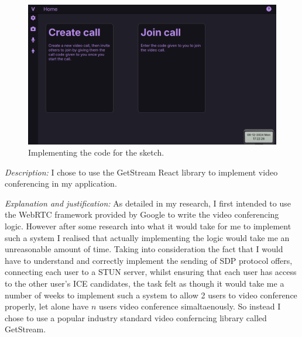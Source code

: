 \begin{figure}[H]
\centering

\includegraphics[scale=0.2]{Images/Sketch_final.png}

\caption{Implementing the code for the sketch.}
\end{figure}

\textit{Description:} I chose to use the GetStream React
library to implement video conferencing in my application. \\ 
\vspace{0.2cm}

\textit{Explanation and justification:} As detailed in my research, I first 
intended to use the WebRTC framework provided by Google to 
write the video conferencing logic. However after some research 
into what it would take for me to implement such a system I 
realised that actually implementing the logic would take me 
an unreasonable amount of time. Taking into consideration the
fact that I would have to understand and correctly implement 
the sending of SDP protocol offers, connecting each user to a
STUN server, whilst ensuring that each user has access to 
the other user's ICE candidates, the task felt as though it
would take me a number of weeks to implement such a system 
to allow 2 users to video conference properly, let alone have 
$n$ users video conference simaltaenously. So instead I chose 
to use a popular industry standard video conferncing library 
called GetStream. \\ \vspace{0.2cm}

